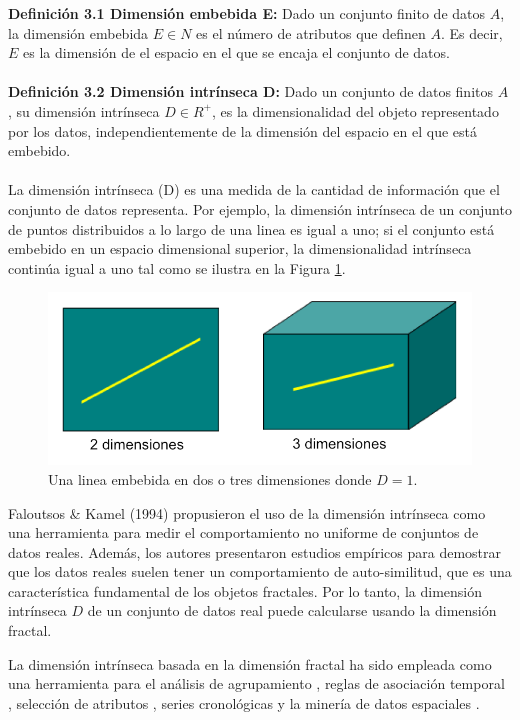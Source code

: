\textbf{Definición 3.1 Dimensión embebida  E:} Dado un conjunto finito de datos $A$, la  
dimensión embebida $E \in N$ es el número de atributos que definen $A$. Es decir, $E$ es la dimensión de el espacio en el que se encaja el conjunto de datos.
\\\\
\textbf{Definición 3.2 Dimensión intrínseca D:} Dado un conjunto de datos finitos $A$, su dimensión intrínseca
$D \in R^+$, es la dimensionalidad del objeto representado por los datos, independientemente de la
dimensión del espacio en el que está embebido.
\\\\
La dimensión intrínseca (D) es una medida de la cantidad de información que el conjunto de datos representa. Por ejemplo, la dimensión intrínseca de un conjunto de puntos distribuidos a lo largo de una linea  es igual a uno; si el conjunto está embebido  en un espacio dimensional superior, la dimensionalidad intrínseca   continúa igual a uno tal como se ilustra en la Figura \ref{fig:ima3}.

\begin{figure}[h]
\centering
\includegraphics[scale=1.2]{chapter4/ima3.png}
\caption{Una linea embebida en dos o tres dimensiones donde $D=1$.}
\label{fig:ima3}
\end{figure}


Faloutsos & Kamel (1994) \cite{conf/pods/FaloutsosK94} propusieron el uso de la dimensión intrínseca como una herramienta para medir el comportamiento no uniforme de conjuntos de datos reales. Además, los autores presentaron estudios empíricos para demostrar que los datos reales suelen tener un comportamiento de auto-similitud, que es  una   característica fundamental de los objetos fractales. Por lo tanto, la dimensión intrínseca $D$ de un conjunto de datos real puede calcularse usando la dimensión fractal.

La dimensión intrínseca basada en la dimensión fractal ha sido empleada como una herramienta para el análisis de agrupamiento \cite{Barbara2003},  reglas de asociación temporal \cite{Barbara2004}, selección de atributos \cite{journals/jidm/TrainaTF10}, series cronológicas \cite{Chakrabarti:2002:FLA:584792.584797} y la minería de datos espaciales \cite{Traina:2001:TST:502512.502538}.

